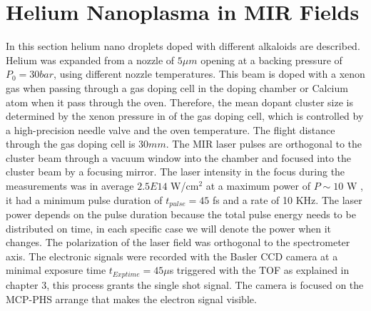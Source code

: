 
\section{Helium Nanoplasma in MIR Fields }
 
In this section helium nano droplets doped with different alkaloids are described. Helium was expanded from a nozzle of $5 \mu m$ opening at a backing pressure of $P_{0}=30 bar$, using different nozzle temperatures. This beam is doped with a xenon gas when passing through a gas doping cell in the doping chamber or Calcium atom when it pass through the oven. Therefore, the mean dopant cluster size is determined by the xenon pressure in of the gas doping cell, which is controlled by a high-precision needle valve and the oven temperature. The flight distance through the gas doping cell is $30mm$. The MIR laser pulses are orthogonal to the cluster beam through a vacuum window into the chamber and focused into the cluster beam by a focusing mirror.
The laser intensity in the focus during the measurements was in average $2.5E14$ W/cm$^{2}$ at a maximum power of $P\sim 10$ W , it had a minimum pulse duration of $t_{pulse}=45$ fs and a rate of 10 KHz. The laser power depends on the pulse duration because the total pulse energy needs to be distributed on time, in each specific case we will denote the power when it changes. The polarization of the laser field was orthogonal to the spectrometer axis. The electronic signals were recorded with the Basler CCD camera at a minimal exposure time $t_{Exp time}=45 \mu$s triggered with the TOF as explained in chapter 3, this process grants the single shot signal. The camera is focused on the MCP-PHS arrange that makes the electron signal visible. 

